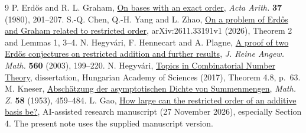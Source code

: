\documentclass[11pt]{article}
\begin{document}
\begin{thebibliography}{9}
 P. Erdős and R. L. Graham, \href{https://www.renyi.hu/~p_erdos/1980-22.pdf}{On bases with an exact order}, \emph{Acta Arith.} \textbf{37} (1980), 201--207.
 S.-Q. Chen, Q.-H. Yang and L. Zhao, \href{https://arxiv.org/html/2611.33191v1}{On a problem of Erdős and Graham related to restricted order}, arXiv:2611.33191v1 (2026), Theorem 2 and Lemmas 1, 3--4.
 N. Hegyvári, F. Hennecart and A. Plagne, \href{https://doi.org/10.1515/crll.2003.055}{A proof of two Erdős conjectures on restricted addition and further results}, \emph{J. Reine Angew. Math.} \textbf{560} (2003), 199--220.
 N. Hegyvári, \href{https://real-d.mtak.hu/1038/7/dc_1260_16_doktori_mu.pdf}{Topics in Combinatorial Number Theory}, dissertation, Hungarian Academy of Sciences (2017), Theorem 4.8, p.~63.
 M. Kneser, \href{https://doi.org/10.1007/BF01174162}{Abschätzung der asymptotischen Dichte von Summenmengen}, \emph{Math. Z.} \textbf{58} (1953), 459--484.
 L. Gao, \href{https://github.com/Leo66Gao/solved-conjectures/tree/main/48-erdos-338-restricted-orders}{How large can the restricted order of an additive basis be?}, AI-assisted research manuscript (27 November 2026), especially Section 4. The present note uses the supplied manuscript version.
\end{thebibliography}
\end{document}
